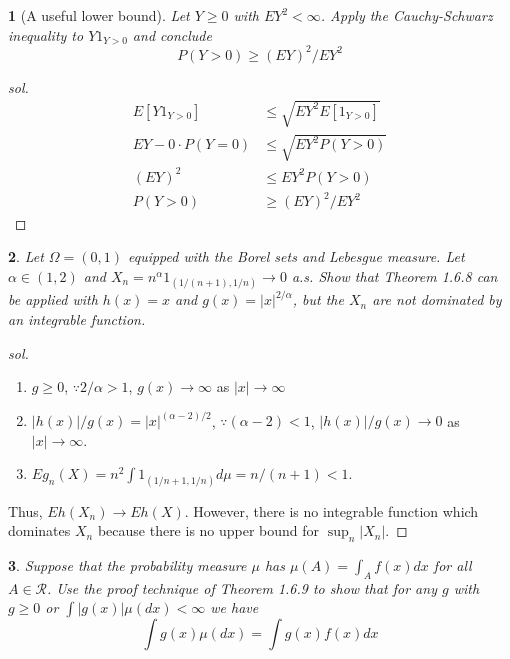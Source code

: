 \documentclass{report}
\newtheorem{ex}{}[section]
\begin{document}
\begin{ex}[A useful lower bound]
Let $Y \ge 0$ with $EY^2 <\infty$. Apply the Cauchy-Schwarz inequality to $Y 1_{Y >0}$ and conclude
\[P(Y > 0) \ge (EY)^2 / EY^2\]
\end{ex}
\begin{proof}[sol]
\begin{align*}
    E[Y1_{Y > 0}] &\le \sqrt{EY^2E[1_{Y>0}]}\\
    EY - 0\cdot P(Y = 0) &\le \sqrt{EY^2P(Y >0)}\\
    (EY)^2 &\le EY^2P(Y > 0)\\
    P(Y > 0) &\ge (EY)^2 / EY^2
\end{align*}
\end{proof}
\begin{ex}
Let $\Omega = (0,1)$ equipped with the Borel sets and Lebesgue measure. Let $\alpha \in (1,2)$ and $X_n = n^\alpha 1_{(1/(n+1), 1/n)} \to 0$ a.s. Show that Theorem 1.6.8 can be applied with $h(x) = x$ and $g(x) = |x|^{2/\alpha}$, but the $X_n$ are not dominated by an integrable function.
\end{ex}
\begin{proof}[sol]~
\begin{enumerate}
    \item $g \ge 0$, $\because 2/\alpha > 1$, $g(x) \to \infty$ as $|x| \to \infty$
    \item $|h(x)|/g(x) = |x|^{(\alpha -2)/2}$, $\because (\alpha - 2) < 1$, $|h(x)|/g(x) \to 0$ as $|x| \to \infty$.
    \item $Eg_n(X) = n^2\int 1_{(1/n+1, 1/n)}d\mu  = n/(n+1) < 1$.
\end{enumerate}
Thus, $Eh(X_n) \to Eh(X)$. However, there is no integrable function which dominates $X_n$ because there is no upper bound for $\sup_n |X_n|$.
\end{proof}
\begin{ex}
Suppose that the probability measure $\mu$ has $\mu(A) = \int_A f(x)dx$ for all $A \in \mathcal{R}$. Use the proof technique of Theorem 1.6.9 to show that for any $g$ with $g \ge 0$ or $\int |g(x)|\mu(dx) < \infty$ we have
\[\int g(x)\mu(dx) = \int g(x)f(x)dx\]
\end{ex}
\end{document}

